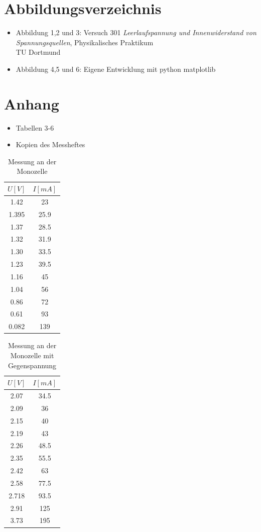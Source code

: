 \documentclass[11pt]{article}
\begin{document}
 \newpage
\section{Abbildungsverzeichnis}
\begin{itemize}
\item Abbildung 1,2 und 3: Versuch 301 \textit{Leerlaufspannung und Innenwiderstand von Spannungsquellen}, Physikalisches Praktikum\\ TU Dortmund
\item Abbildung 4,5 und 6: Eigene Entwicklung mit python matplotlib
\end{itemize}
\section{Anhang}
\begin{itemize}
\item Tabellen 3-6
\item Kopien des Messheftes
\end{itemize}
\begin{table}[h]
 \centering
 \caption{Messung an der Monozelle}
 \begin{tabular}{|c|c|}
  \hline
  $U[V]$ & $I[mA]$  \\
  \hline
  1.42 & 23 \\
  1.395 & 25.9 \\
  1.37& 28.5 \\
  1.32 & 31.9 \\
  1.30 & 33.5\\
  1.23 & 39.5\\
  1.16 & 45 \\
  1.04 & 56\\
  0.86 & 72\\
  0.61 & 93\\
  0.082 & 139\\
  \hline
 \end{tabular}
 \label{Messung 1}
 \end{table}
 
 
 \begin{table}[h]
 \centering
 \caption{Messung an der Monozelle mit Gegenspannung}
 \begin{tabular}{|c|c|}
  \hline
  $U[V]$ & $I[mA]$  \\
  \hline
  2.07 & 34.5 \\
  2.09 & 36 \\
  2.15 & 40 \\
  2.19 & 43 \\
  2.26 & 48.5\\
  2.35 & 55.5\\
  2.42 & 63 \\
  2.58 & 77.5\\
  2.718 & 93.5\\
  2.91 & 125\\
  3.73 & 195\\
  \hline
 \end{tabular}
 \label{Messung 2}
 \end{table}
 
\end{document}
